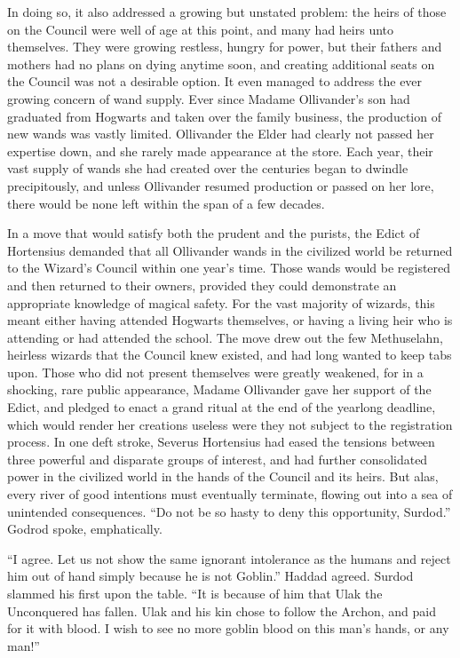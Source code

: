 \SmallVSpace
In doing so, it also addressed a growing but unstated problem: the heirs of those on the Council were well of age at this point, and many had heirs unto themselves. They were growing restless, hungry for power, but their fathers and mothers had no plans on dying anytime soon, and creating additional seats on the Council was not a desirable option.
\SmallVSpace
It even managed to address the ever growing concern of wand supply. Ever since Madame Ollivander’s son had graduated from Hogwarts and taken over the family business, the production of new wands was vastly limited. Ollivander the Elder had clearly not passed her expertise down, and she rarely made appearance at the store. Each year, their vast supply of wands she had created over the centuries began to dwindle precipitously, and unless Ollivander resumed production or passed on her lore, there would be none left within the span of a few decades.

\pagebreak
In a move that would satisfy both the prudent and the purists, the Edict of Hortensius demanded that all Ollivander wands in the civilized world be returned to the Wizard’s Council within one year’s time. Those wands would be registered and then returned to their owners, provided they could demonstrate an appropriate knowledge of magical safety. For the vast majority of wizards, this meant either having attended Hogwarts themselves, or having a living heir who is attending or had attended the school.
\SmallVSpace
The move drew out the few Methuselahn, heirless wizards that the Council knew existed, and had long wanted to keep tabs upon. Those who did not present themselves were greatly weakened, for in a shocking, rare public appearance, Madame Ollivander gave her support of the Edict, and pledged to enact a grand ritual at the end of the yearlong deadline, which would render her creations useless were they not subject to the registration process.
\SmallVSpace
In one deft stroke, Severus Hortensius had eased the tensions between three powerful and disparate groups of interest, and had further consolidated power in the civilized world in the hands of the Council and its heirs.
\SomeVSpace
But alas, every river of good intentions must eventually terminate, flowing out into a sea of unintended consequences.
\simpleline
\pagebreak
{}
“Do not be so hasty to deny this opportunity, Surdod.” Godrod spoke, emphatically.

“I agree. Let us not show the same ignorant intolerance as the humans and reject him out of hand simply because he is not Goblin.” Haddad agreed.
\SmallVSpace
Surdod slammed his first upon the table. “It is because of him that Ulak the Unconquered has fallen. Ulak and his kin chose to follow the Archon, and paid for it with blood. I wish to see no more goblin blood on this man’s hands, or any man!”

